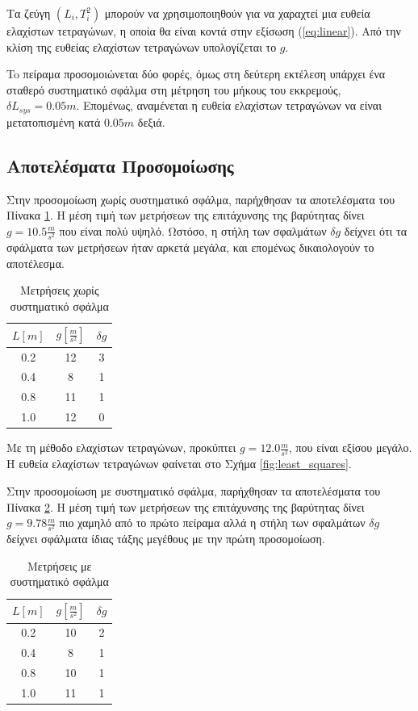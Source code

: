 \documentclass[assignment1.tex]{subfiles}
\begin{document}
Τα ζεύγη $(L_i, T_i^2)$ μπορούν να χρησιμοποιηθούν για να χαραχτεί μια ευθεία ελαχίστων τετραγώνων, η οποία θα είναι κοντά στην εξίσωση (\ref{eq:linear}). Από την κλίση της ευθείας ελαχίστων τετραγώνων υπολογίζεται το $g$.

To πείραμα προσομοιώνεται δύο φορές, όμως στη δεύτερη εκτέλεση υπάρχει ένα σταθερό συστηματικό σφάλμα στη μέτρηση του μήκους του εκκρεμούς, $\delta L_{sys}=0.05m$. Επομένως, αναμένεται η ευθεία ελαχίστων τετραγώνων να είναι μετατοπισμένη κατά $0.05m$ δεξιά.

\subsection{Αποτελέσματα Προσομοίωσης}
Στην προσομοίωση χωρίς συστηματικό σφάλμα, παρήχθησαν τα αποτελέσματα του Πίνακα \ref{table:meas1}. Η μέση τιμή των μετρήσεων της επιτάχυνσης της βαρύτητας δίνει $g=10.5\frac{m}{s^2}$ που είναι πολύ υψηλό. Ωστόσο, η στήλη των σφαλμάτων $\delta g$ δείχνει ότι τα σφάλματα των μετρήσεων ήταν αρκετά μεγάλα, και επομένως δικαιολογούν το αποτέλεσμα.

\begin{table}[ht]
\centering
\begin{tabular}{||c c c ||} 
 \hline
 $L[m]$ & $g[\frac{m}{s^2}]$ & $\delta g$ \\ [0.5ex] 
 \hline\hline
 0.2 & 12 & 3 \\ 
 0.4 & 8 & 1 \\
 0.8 & 11 & 1 \\
 1.0 & 12 & 0 \\ [1ex] 
 \hline
\end{tabular}
\caption{Μετρήσεις χωρίς συστηματικό σφάλμα}
\label{table:meas1}
\end{table}

Με τη μέθοδο ελαχίστων τετραγώνων, προκύπτει $g=12.0\frac{m}{s^2}$, που είναι εξίσου μεγάλο. Η ευθεία ελαχίστων τετραγώνων φαίνεται στο Σχήμα \ref{fig:least_squares}.

Στην προσομοίωση με συστηματικό σφάλμα, παρήχθησαν τα αποτελέσματα του Πίνακα \ref{table:meas2}. Η μέση τιμή των μετρήσεων της επιτάχυνσης της βαρύτητας δίνει $g=9.78\frac{m}{s^2}$ πιο χαμηλό από το πρώτο πείραμα αλλά η στήλη των σφαλμάτων $\delta g$ δείχνει σφάλματα ίδιας τάξης μεγέθους με την πρώτη προσομοίωση.

\begin{table}[ht]
\centering
\begin{tabular}{||c c c ||} 
 \hline
 $L[m]$ & $g[\frac{m}{s^2}]$ & $\delta g$ \\ [0.5ex] 
 \hline\hline
 0.2 & 10 & 2 \\ 
 0.4 & 8 & 1 \\
 0.8 & 10 & 1 \\
 1.0 & 11 & 1 \\ [1ex] 
 \hline
\end{tabular}
\caption{Μετρήσεις με συστηματικό σφάλμα}
\label{table:meas2}
\end{table}
\end{document}
